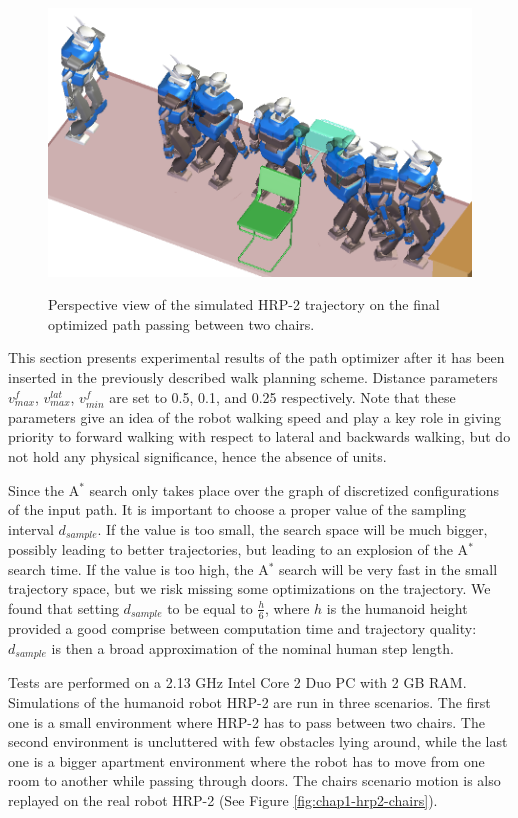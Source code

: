 \begin{figure}
  \centering
      {\includegraphics[width = \linewidth]
        {src/chap1-path-optimization/chairs-hash-optim-perspective-hrp2.png}}
      \caption{Perspective view of the simulated HRP-2 trajectory on
        the final optimized path passing between two chairs.}
      \label{fig:chap1-chairs-hash-optim-perspective-hrp2}
\end{figure}

This section presents experimental results of the path optimizer after
it has been inserted in the previously described walk planning
scheme. Distance parameters $v_{max}^f$, $v_{max}^{lat}$, $v_{min}^f$
are set to 0.5, 0.1, and 0.25 respectively. Note that these parameters
give an idea of the robot walking speed and play a key role in giving
priority to forward walking with respect to lateral and backwards
walking, but do not hold any physical significance, hence the absence
of units.

Since the A$^{*}$ search only takes place over the graph of discretized
configurations of the input path. It is important to choose a proper
value of the sampling interval $d_{sample}$. If the value is too
small, the search space will be much bigger, possibly leading to
better trajectories, but leading to an explosion of the A$^{*}$ search
time. If the value is too high, the A$^{*}$ search will be very fast in the
small trajectory space, but we risk missing some optimizations on the
trajectory. We found that setting $d_{sample}$ to be equal to
$\frac{h}{6}$, where $h$ is the humanoid height provided a good
comprise between computation time and trajectory quality: $d_{sample}$
is then a broad approximation of the nominal human step length.

Tests are performed on a 2.13 GHz Intel Core 2 Duo PC with 2 GB RAM.
Simulations of the humanoid robot HRP-2 are run in three scenarios.
The first one is a small environment where HRP-2 has to pass between
two chairs. The second environment is uncluttered with few obstacles
lying around, while the last one is a bigger apartment environment
where the robot has to move from one room to another while passing
through doors. The chairs scenario motion is also replayed on the real
robot HRP-2 (See Figure \ref{fig:chap1-hrp2-chairs}).

